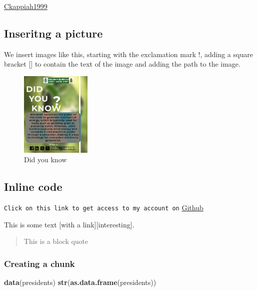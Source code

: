 \documentclass[
]{article}
\newenvironment{Shaded}{\begin{snugshade}}{\end{snugshade}}
\newcommand{\FunctionTok}[1]{\textcolor[rgb]{0.13,0.29,0.53}{\textbf{#1}}}
\newcommand{\NormalTok}[1]{#1}
\begin{document}
\href{https://github.com/ckappiah1999/Charles_Nana}{Ckappiah1999}

\subsection{Inseritng a picture}\label{inseritng-a-picture}

We insert images like this, starting with the exclamation mark !, adding
a square bracket {[}{]} to contain the text of the image and adding the
path to the image.

\begin{figure}
\centering
\includegraphics[width=0.3\textwidth,height=\textheight]{Wind.jpg}
\caption{Did you know}
\end{figure}

\subsection{Inline code}\label{inline-code}

\texttt{Click\ on\ this\ link\ to\ get\ access\ to\ my\ account\ on}
\href{https://github.com/ckappiah1999/Charles_Nana}{Github}

This is some text {[}with a link{]}{[}interesting{]}.

\begin{quote}
This is a block quote
\end{quote}

\subsubsection{Creating a chunk}\label{creating-a-chunk}

\begin{Shaded}
\begin{Highlighting}[]
\FunctionTok{data}\NormalTok{(presidents)}
\FunctionTok{str}\NormalTok{(}\FunctionTok{as.data.frame}\NormalTok{(presidents))}
\end{Highlighting}
\end{Shaded}
\end{document}
